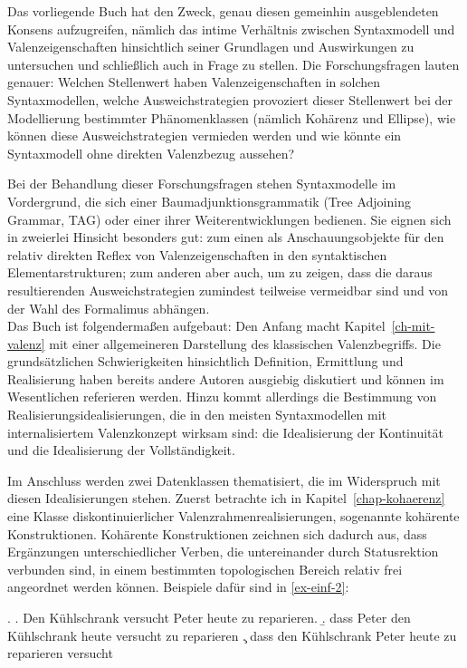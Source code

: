 Das vorliegende Buch hat den Zweck, genau diesen gemeinhin ausgeblendeten Konsens aufzugreifen, nämlich das intime Verhältnis zwischen Syntaxmodell und Valenzeigenschaften hinsichtlich seiner Grundlagen und Auswirkungen zu untersuchen und schlie\ss lich auch in Frage zu stellen. Die Forschungsfragen lauten genauer: Welchen Stellenwert haben Valenzeigenschaften in solchen Syntaxmodellen, welche Ausweichstrategien provoziert dieser Stellenwert bei der Modellierung bestimmter Phänomenklassen (nämlich Kohärenz und Ellipse), wie können diese Ausweichstrategien vermieden werden und wie könnte ein Syntaxmodell ohne direkten Valenzbezug aussehen?

Bei der Behandlung dieser Forschungsfragen stehen Syntaxmodelle im Vordergrund, die sich einer Baumadjunktionsgrammatik (Tree Adjoining Grammar, TAG) oder einer ihrer Weiterentwicklungen bedienen. Sie eignen sich in zweierlei Hinsicht besonders gut: zum einen als Anschauungsobjekte für den relativ direkten Reflex von Valenzeigenschaften in den syntaktischen Elementarstrukturen; zum anderen aber auch, um zu zeigen, dass die daraus resultierenden Ausweichstrategien zumindest teilweise vermeidbar sind und von der Wahl des Formalimus abhängen. \\  

Das Buch ist folgendermaßen aufgebaut: Den Anfang macht Kapitel~\ref{ch-mit-valenz} mit einer allgemeineren Darstellung des klassischen Valenzbegriffs. Die grundsätzlichen Schwierigkeiten hinsichtlich Definition, Ermittlung und Realisierung haben bereits andere Autoren ausgiebig diskutiert und können im Wesentlichen referieren werden. Hinzu kommt allerdings die Bestimmung von Realisierungsidealisierungen, die in den meisten Syntaxmodellen mit internalisiertem Valenzkonzept wirksam sind: die Idealisierung der Kontinuität und die Idealisierung der Vollständigkeit.

Im Anschluss werden zwei Datenklassen thematisiert, die im Widerspruch mit diesen Idealisierungen stehen. Zuerst betrachte ich in Kapitel~\ref{chap-kohaerenz} eine Klasse diskontinuierlicher Valenzrahmenrealisierungen, sogenannte kohärente Konstruktionen. Kohärente Konstruktionen zeichnen sich dadurch aus, dass Ergänzungen unterschiedlicher Verben, die untereinander durch Statusrektion verbunden sind, in einem bestimmten topologischen Bereich relativ frei angeordnet werden können. Beispiele dafür sind in \ref{ex-einf-2}:     
 
  \ex. \label{ex-einf-2}
  \a. \label{ex-einf-2-a}Den Kühlschrank versucht Peter heute zu reparieren.
  \b. \label{ex-einf-2-b}dass Peter den Kühlschrank heute versucht zu reparieren
  \c. \label{ex-einf-2-c}dass den Kühlschrank Peter heute zu reparieren versucht

